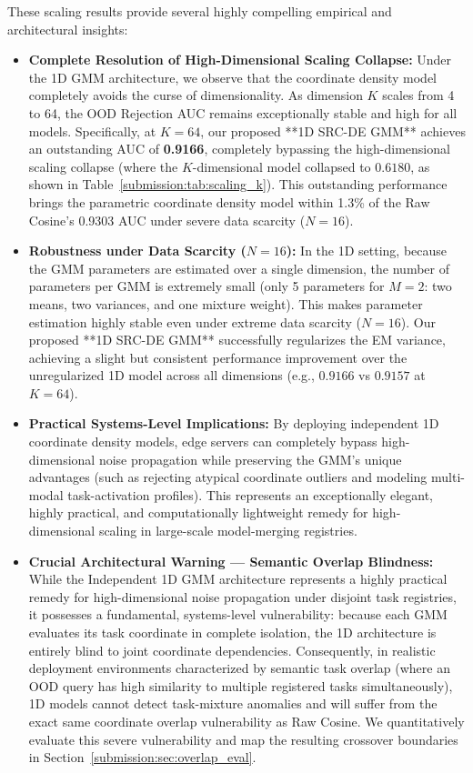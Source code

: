 These scaling results provide several highly compelling empirical and architectural insights:
\begin{itemize}
    \item {\bf Complete Resolution of High-Dimensional Scaling Collapse:} Under the 1D GMM architecture, we observe that the coordinate density model completely avoids the curse of dimensionality. As dimension $K$ scales from 4 to 64, the OOD Rejection AUC remains exceptionally stable and high for all models. Specifically, at $K=64$, our proposed **1D SRC-DE GMM** achieves an outstanding AUC of {\bf 0.9166}, completely bypassing the high-dimensional scaling collapse (where the $K$-dimensional model collapsed to $0.6180$, as shown in Table~\ref{submission:tab:scaling_k}). This outstanding performance brings the parametric coordinate density model within 1.3\% of the Raw Cosine's 0.9303 AUC under severe data scarcity ($N=16$).
    \item {\bf Robustness under Data Scarcity ($N=16$):} In the 1D setting, because the GMM parameters are estimated over a single dimension, the number of parameters per GMM is extremely small (only 5 parameters for $M=2$: two means, two variances, and one mixture weight). This makes parameter estimation highly stable even under extreme data scarcity ($N=16$). Our proposed **1D SRC-DE GMM** successfully regularizes the EM variance, achieving a slight but consistent performance improvement over the unregularized 1D model across all dimensions (e.g., $0.9166$ vs $0.9157$ at $K=64$).
    \item {\bf Practical Systems-Level Implications:} By deploying independent 1D coordinate density models, edge servers can completely bypass high-dimensional noise propagation while preserving the GMM's unique advantages (such as rejecting atypical coordinate outliers and modeling multi-modal task-activation profiles). This represents an exceptionally elegant, highly practical, and computationally lightweight remedy for high-dimensional scaling in large-scale model-merging registries.
    \item {\bf Crucial Architectural Warning — Semantic Overlap Blindness:} While the Independent 1D GMM architecture represents a highly practical remedy for high-dimensional noise propagation under disjoint task registries, it possesses a fundamental, systems-level vulnerability: because each GMM evaluates its task coordinate in complete isolation, the 1D architecture is entirely blind to joint coordinate dependencies. Consequently, in realistic deployment environments characterized by semantic task overlap (where an OOD query has high similarity to multiple registered tasks simultaneously), 1D models cannot detect task-mixture anomalies and will suffer from the exact same coordinate overlap vulnerability as Raw Cosine. We quantitatively evaluate this severe vulnerability and map the resulting crossover boundaries in Section~\ref{submission:sec:overlap_eval}.
\end{itemize}

